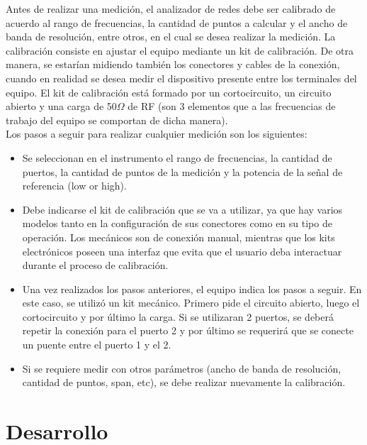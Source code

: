 \documentclass[a4paper,10pt]{article}
\begin{document}
	\indent Antes de realizar una medici\'on, el analizador de redes debe ser 
	calibrado de acuerdo al rango de frecuencias, la cantidad de puntos a calcular y el ancho de banda de resoluci\'on, entre otros, en el cual se desea realizar la 
	medici\'on. La calibraci\'on consiste en ajustar el equipo mediante un kit de 
	calibraci\'on. De otra manera, se estar\'ian midiendo
	tambi\'en los conectores y cables de la conexi\'on, cuando en realidad se desea 
	medir el dispositivo presente entre los terminales del equipo. El kit de calibraci\'on est\'a formado por un
	cortocircuito, un circuito abierto y una carga de 50$\Omega$ de RF (son 3 
	elementos que a las frecuencias de trabajo del equipo se comportan de dicha 
	manera). \\
	\indent Los pasos a seguir para realizar cualquier medici\'on son los 
	siguientes:
	
	\begin{itemize}
		\item Se seleccionan en el instrumento el rango de frecuencias, la 
		cantidad de puertos, la cantidad de puntos de la medici\'on y la potencia 
		de la se\~nal de referencia (low or high). 
		\item Debe indicarse el kit de calibraci\'on que se va a utilizar, ya que
		hay varios modelos tanto en la configuraci\'on de sus conectores como en 
		su tipo de operaci\'on. Los mec\'anicos son de conexi\'on manual, mientras que
		los kits electr\'onicos poseen una interfaz que evita que el usuario deba 
		interactuar durante el proceso de calibraci\'on. 
		\item Una vez realizados los pasos anteriores, el equipo indica los 
		pasos a seguir. En este caso, se utiliz\'o un kit mec\'anico. Primero pide 
		el circuito abierto, luego el cortocircuito y por \'ultimo la carga. Si se
		utilizaran 2 puertos, se deber\'a repetir la conexi\'on para el puerto 2 y 
		por \'ultimo se requerir\'a que se conecte un puente entre el puerto 1 y el 
		2. 
		\item Si se requiere medir con otros par\'ametros (ancho de banda de resoluci\'on, cantidad de puntos, span, etc), se debe 
		realizar nuevamente la calibraci\'on. 
	\end{itemize}
	
\section{Desarrollo}
\end{document}
